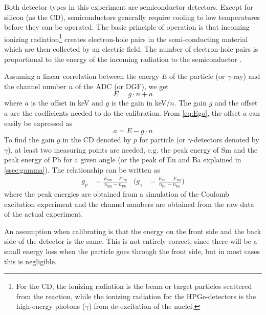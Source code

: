 \documentclass[twoside,english]{uiofysmaster/uiofysmaster}
\newcommand{\ga}{$\gamma$}
\let\orgautoref\autoref
\renewcommand{\autoref}
        {%
		 \def\subsectionautorefname{Section}%
		 \def\subsubsectionautorefname{Section}%
          \orgautoref}
\begin{document}
Both detector types in this experiment are semiconductor detectors. 
Except for silicon (as the CD), semiconductors generally require cooling to low temperatures before they can be operated. 
The basic principle of operation is that incoming ionizing radiation\footnote{For the CD, the ionizing radiation is the beam or target particles scattered from the reaction, while the ionizing radiation for the HPGe-detectors is the high-energy photons (\ga) from de-excitation of the nuclei.} creates electron-hole pairs in the semi-conducting material which are then collected by an electric field. 
The number of electron-hole pairs is proportional to the energy of the incoming radiation to the semiconductor \cite{WRLeo}. 

Assuming a linear correlation between the energy $E$ of the particle (or \ga-ray) and the channel number $n$ of the ADC (or DGF), we get
\begin{equation}\label{eq:Ego}
	E = g \cdot n + a
\end{equation}
where $a$ is the offset in keV and $g$ is the gain in keV/$n$. 
The gain $g$ and the offset $a$ are the coefficients needed to do the calibration.
From \autoref{eq:Ego}, the offset $a$ can easily be expressed as 
\begin{equation}\label{eq:offset}
	a = E - g \cdot n 
\end{equation}
To find the gain $g$ in the CD denoted by $p$ for particle (or \ga-detectors denoted by \ga), at least two measuring points are needed, e.g. the peak energy of Sm and the peak energy of Pb for a given angle (or the peak of Eu and Ba explained in \autoref{ssec:gamma}). 
The relationship can be written as 
\begin{align}\label{eq:gain}
	g_p &= \frac{E_{\text{Sm}} - E_{\text{Pb}}}{n_{\text{Sm}} - n_{\text{Pb}}}
	&
	\Bigg( g_\gamma &= \frac{E_{\text{Eu}} - E_{\text{Ba}}}{n_{\text{Eu}} - n_{\text{Ba}}} \Bigg)
\end{align}
where the peak energies are obtained from a simulation of the Coulomb excitation experiment and the channel numbers are obtained from the raw data of the actual experiment.

An assumption when calibrating is that the energy on the front side and the back side of the detector is the same. 
This is not entirely correct, since there will be a small energy loss when the particle goes through the front side, but in most cases this is negligible.


\end{document}

